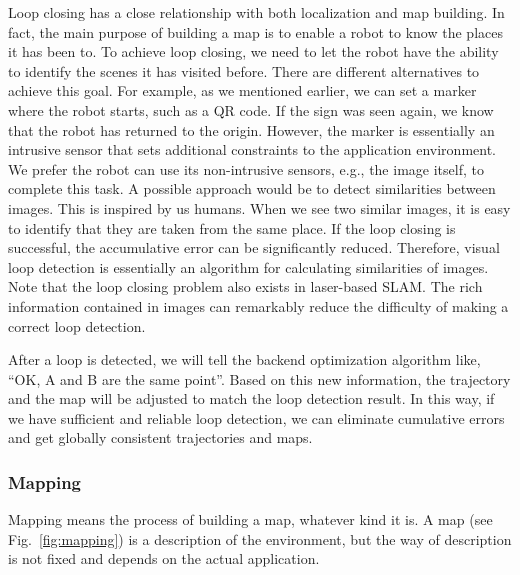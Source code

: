 Loop closing has a close relationship with both localization and map building. In fact, the main purpose of building a map is to enable a robot to know the places it has been to. To achieve loop closing, we need to let the robot have the ability to identify the scenes it has visited before. There are different alternatives to achieve this goal. For example, as we mentioned earlier, we can set a marker where the robot starts, such as a QR code. If the sign was seen again, we know that the robot has returned to the origin. However, the marker is essentially an intrusive sensor that sets additional constraints to the application environment. We prefer the robot can use its non-intrusive sensors, e.g., the image itself, to complete this task. A possible approach would be to detect similarities between images. This is inspired by us humans. When we see two similar images, it is easy to identify that they are taken from the same place. If the loop closing is successful, the accumulative error can be significantly reduced. Therefore, visual loop detection is essentially an algorithm for calculating similarities of images. Note that the loop closing problem also exists in laser-based SLAM. The rich information contained in images can remarkably reduce the difficulty of making a correct loop detection.

After a loop is detected, we will tell the backend optimization algorithm like, ``OK,  A and B are the same point''. Based on this new information, the trajectory and the map will be adjusted to match the loop detection result. In this way, if we have sufficient and reliable loop detection, we can eliminate cumulative errors and get globally consistent trajectories and maps.

\subsubsection{Mapping}
Mapping means the process of building a map, whatever kind it is. A map (see Fig.~\ref{fig:mapping}) is a description of the environment, but the way of description is not fixed and depends on the actual application.


